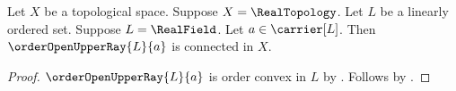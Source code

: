 \begin{corollary}\label{real_open_upper_ray_is_connected}
    Let $X$ be a topological space.
    Suppose $X=\RealTopology$.
    Let $L$ be a linearly ordered set.
    Suppose $L=\RealField$.
    Let $a\in\carrier[L]$.
    Then $\orderOpenUpperRay{L}{a}$ is connected in $X$.
\end{corollary}
\begin{proof}
    $\orderOpenUpperRay{L}{a}$ is order convex in $L$ by
        .
    Follows by .
\end{proof}
